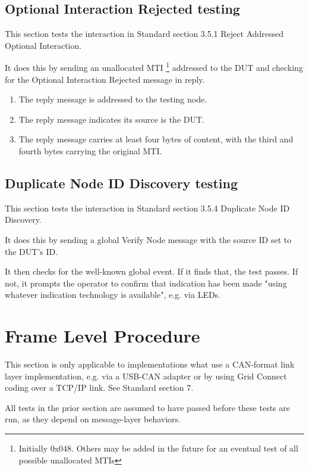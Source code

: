 \documentclass[11pt]{article}
\begin{document}
\subsection{Optional Interaction Rejected testing}

This section tests the interaction in Standard section 3.5.1 Reject Addressed Optional Interaction.

It does this by sending an unallocated MTI
\footnote{Initially 0x048. Others may be added in the future for an eventual
    test of all possible unallocated MTIs}
addressed to the DUT and checking for the Optional Interaction Rejected 
message in reply.

    \begin{enumerate}
    \item The reply message is addressed to the testing node.
    \item The reply message indicates its source is the DUT.
    \item The reply message carries at least four bytes of content, with the 
            third and fourth bytes carrying the original MTI.
    \end{enumerate}

\subsection{Duplicate Node ID Discovery testing}

This section tests the interaction in Standard section 3.5.4 Duplicate Node ID Discovery.

It does this by sending a global Verify Node message with the source ID set to the DUT's ID.

It then checks for the well-known global event.  If it finds that, the test passes.
If not, it prompts the operator to confirm that indication has been made 
"using whatever indication technology is available", e.g. via LEDs.

\section{Frame Level Procedure}

This section is only applicable to implementations what use a CAN-format link layer
implementation, e.g. via a USB-CAN adapter or by using Grid Connect coding
over a TCP/IP link. See Standard section 7.

All tests in the prior section are assumed to have passed before these
tests are run, as they depend on message-layer behaviors.
\end{document}
